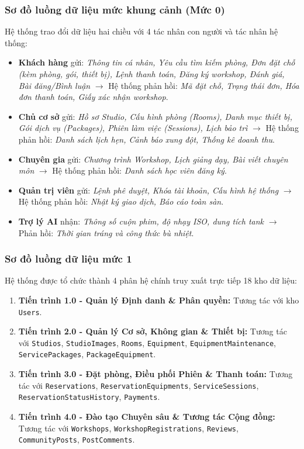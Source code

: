 \subsubsection{Sơ đồ luồng dữ liệu mức khung cảnh (Mức 0)}
Hệ thống trao đổi dữ liệu hai chiều với 4 tác nhân con người và tác nhân hệ thống:
\begin{itemize}[leftmargin=2em]
    \item \textbf{Khách hàng} gửi: \textit{Thông tin cá nhân, Yêu cầu tìm kiếm phòng, Đơn đặt chỗ (kèm phòng, gói, thiết bị), Lệnh thanh toán, Đăng ký workshop, Đánh giá, Bài đăng/Bình luận} $\rightarrow$ Hệ thống phản hồi: \textit{Mã đặt chỗ, Trạng thái đơn, Hóa đơn thanh toán, Giấy xác nhận workshop}.
    \item \textbf{Chủ cơ sở} gửi: \textit{Hồ sơ Studio, Cấu hình phòng (Rooms), Danh mục thiết bị, Gói dịch vụ (Packages), Phiên làm việc (Sessions), Lịch bảo trì} $\rightarrow$ Hệ thống phản hồi: \textit{Danh sách lịch hẹn, Cảnh báo xung đột, Thống kê doanh thu}.
    \item \textbf{Chuyên gia} gửi: \textit{Chương trình Workshop, Lịch giảng dạy, Bài viết chuyên môn} $\rightarrow$ Hệ thống phản hồi: \textit{Danh sách học viên đăng ký}.
    \item \textbf{Quản trị viên} gửi: \textit{Lệnh phê duyệt, Khóa tài khoản, Cấu hình hệ thống} $\rightarrow$ Hệ thống phản hồi: \textit{Nhật ký giao dịch, Báo cáo toàn sàn}.
    \item \textbf{Trợ lý AI} nhận: \textit{Thông số cuộn phim, độ nhạy ISO, dung tích tank} $\rightarrow$ Phản hồi: \textit{Thời gian tráng và công thức bù nhiệt}.
\end{itemize}

\subsubsection{Sơ đồ luồng dữ liệu mức 1}
Hệ thống được tổ chức thành 4 phân hệ chính truy xuất trực tiếp 18 kho dữ liệu:
\begin{enumerate}[leftmargin=2em]
    \item \textbf{Tiến trình 1.0 - Quản lý Định danh \& Phân quyền:} Tương tác với kho \texttt{Users}.
    \item \textbf{Tiến trình 2.0 - Quản lý Cơ sở, Không gian \& Thiết bị:} Tương tác với \texttt{Studios}, \texttt{StudioImages}, \texttt{Rooms}, \texttt{Equipment}, \texttt{EquipmentMaintenance}, \texttt{ServicePackages}, \texttt{PackageEquipment}.
    \item \textbf{Tiến trình 3.0 - Đặt phòng, Điều phối Phiên \& Thanh toán:} Tương tác với \texttt{Reservations}, \texttt{ReservationEquipments}, \texttt{ServiceSessions}, \texttt{ReservationStatusHistory}, \texttt{Payments}.
    \item \textbf{Tiến trình 4.0 - Đào tạo Chuyên sâu \& Tương tác Cộng đồng:} Tương tác với \texttt{Workshops}, \texttt{WorkshopRegistrations}, \texttt{Reviews}, \texttt{CommunityPosts}, \texttt{PostComments}.
\end{enumerate}

